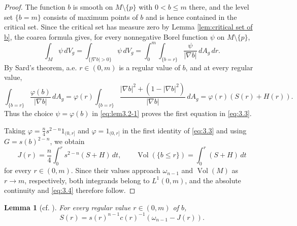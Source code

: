 \documentclass[11pt]{amsart}
\theoremstyle{plain}
\newtheorem{lemma}[theorem]{Lemma}
\numberwithin{equation}{section}
\DeclareMathOperator{\vol}{Vol}
\newcommand{\dvol}{\,dV_g}
\newcommand{\darea}{\,dA_g}
\newcommand{\bsls}{\{b\le r\}}
\newcommand{\bls}{\{b=r\}}
\begin{document}
\begin{proof}
The function $b$ is smooth on $M\setminus\{p\}$ with $0<b\le m$ there, and the level set $\{b=m\}$ consists of maximum points of $b$ and is hence contained in the critical set. Since the critical set has measure zero by Lemma \ref{lem:critical set of b}, the coarea formula gives, for every nonnegative Borel function $\psi$ on $M\setminus\{p\}$, 
\begin{equation}\label{eq:lem3.2-1}
\int_M\psi\dvol=\int_{\{|\nabla b|>0\}}\psi \dvol=\int_0^m\int_{\bls}\frac{\psi}{|\nabla b|}\darea\,dr.
\end{equation}
By Sard's theorem, a.e. $r\in(0,m)$ is a regular value of $b$, and at every regular value,
\begin{equation*}
\int_{\bls}\frac{\varphi(b)}{|\nabla b|}\darea=\varphi(r)\int_{\bls}\frac{|\nabla b|^2+(1-|\nabla b|^2)}{|\nabla b|}\darea=\varphi(r)(S(r)+H(r)).
\end{equation*}
Thus the choice $\psi=\varphi(b)$ in \eqref{eq:lem3.2-1} proves the first equation in \eqref{eq:3.3}.

Taking $\varphi=\frac{n}{4}s^{2-n}1_{(0,r]}$ and $\varphi=1_{(0,r]}$ in the first identity of \eqref{eq:3.3} and using $G=s(b)^{2-n}$, we obtain
\begin{equation*}
J(r)=\frac{n}{4}\int_0^r s^{2-n}(S+H)\,dt,\qquad \vol(\bsls)=\int_0^r(S+H)\,dt
\end{equation*}
for every $r\in(0,m)$. Since their values approach $\omega_{n-1}$ and $\vol(M)$ as $r \to m$, respectively, both integrands belong to $L^1(0,m)$, and the absolute continuity and \eqref{eq:3.4} therefore follow. 
\end{proof}

\begin{lemma}[cf. {\cite[(4.6)]{Man25}}]\label{eq:lemma 3.3}
For every regular value $r\in(0,m)$ of $b$,
\begin{equation}\label{eq:3.8}
S(r)=s(r)^{n-1}c(r)^{-1}(\omega_{n-1}-J(r)).
\end{equation}
\end{lemma}
\end{document}
